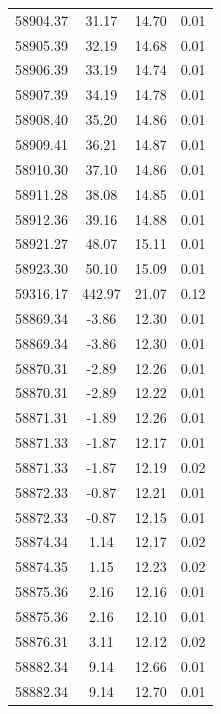 \begin{longtable}{|c|c|c|c|}
 58904.37 &   31.17 &       14.70 &          0.01 \\
 58905.39 &   32.19 &       14.68 &          0.01 \\
 58906.39 &   33.19 &       14.74 &          0.01 \\
 58907.39 &   34.19 &       14.78 &          0.01 \\
 58908.40 &   35.20 &       14.86 &          0.01 \\
 58909.41 &   36.21 &       14.87 &          0.01 \\
 58910.30 &   37.10 &       14.86 &          0.01 \\
 58911.28 &   38.08 &       14.85 &          0.01 \\
 58912.36 &   39.16 &       14.88 &          0.01 \\
 58921.27 &   48.07 &       15.11 &          0.01 \\
 58923.30 &   50.10 &       15.09 &          0.01 \\
 59316.17 &  442.97 &       21.07 &          0.12 \\
 58869.34 &   -3.86 &       12.30 &          0.01 \\
 58869.34 &   -3.86 &       12.30 &          0.01 \\
 58870.31 &   -2.89 &       12.26 &          0.01 \\
 58870.31 &   -2.89 &       12.22 &          0.01 \\
 58871.31 &   -1.89 &       12.26 &          0.01 \\
 58871.33 &   -1.87 &       12.17 &          0.01 \\
 58871.33 &   -1.87 &       12.19 &          0.02 \\
 58872.33 &   -0.87 &       12.21 &          0.01 \\
 58872.33 &   -0.87 &       12.15 &          0.01 \\
 58874.34 &    1.14 &       12.17 &          0.02 \\
 58874.35 &    1.15 &       12.23 &          0.02 \\
 58875.36 &    2.16 &       12.16 &          0.01 \\
 58875.36 &    2.16 &       12.10 &          0.01 \\
 58876.31 &    3.11 &       12.12 &          0.02 \\
 58882.34 &    9.14 &       12.66 &          0.01 \\
 58882.34 &    9.14 &       12.70 &          0.01 \\

\end{longtable}
